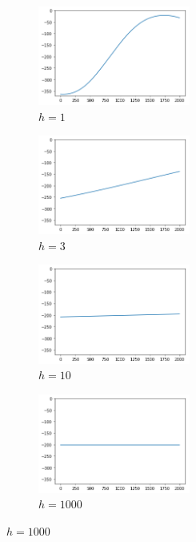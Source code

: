 \documentclass[12pt,a4paper]{article}
\begin{document}
\begin{center}
\begin{figure}
 \caption{Hedonic gradients}
  \begin{subfigure}{6cm}
    \centering\includegraphics[width=5cm]{b1.png}
    \caption{$h = 1$}
  \end{subfigure}
  \begin{subfigure}{6cm}
    \centering\includegraphics[width=5cm]{b3.png}
    \caption{$h = 3$}
  \end{subfigure}
 
  \begin{subfigure}{6cm}
    \centering\includegraphics[width=5cm]{b10.png}
    \caption{$h = 10$}
  \end{subfigure}
  \begin{subfigure}{6cm}
    \centering\includegraphics[width=5cm]{b1000.png}
    \caption{$h = 1000$}
  \end{subfigure}
\end{figure}
\end{center}
\end{document}
